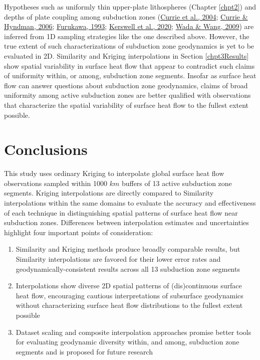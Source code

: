 Hypotheses such as uniformly thin upper-plate lithospheres (Chapter \ref{chpt2}) and depths of plate coupling among subduction zones (\protect\hyperlink{ref-currie2004}{Currie et al., 2004}; \protect\hyperlink{ref-currie2006}{Currie \& Hyndman, 2006}; \protect\hyperlink{ref-furukawa1993}{Furukawa, 1993}; \protect\hyperlink{ref-kerswell2020}{Kerswell et al., 2020}; \protect\hyperlink{ref-wada2009}{Wada \& Wang, 2009}) are inferred from 1D sampling strategies like the one described above. However, the true extent of such characterizations of subduction zone geodynamics is yet to be evaluated in 2D. Similarity and Kriging interpolations in Section \ref{chpt3Results} show spatial variability in surface heat flow that appear to contradict such claims of uniformity within, or among, subduction zone segments. Insofar as surface heat flow can answer questions about subduction zone geodynamics, claims of broad uniformity among active subduction zones are better qualified with observations that characterize the spatial variability of surface heat flow to the fullest extent possible.

\hypertarget{conclusions-1}{%
\section{Conclusions}\label{conclusions-1}}

This study uses ordinary Kriging to interpolate global surface heat flow observations sampled within 1000 \(km\) buffers of 13 active subduction zone segments. Kriging interpolations are directly compared to Similarity interpolations within the same domains to evaluate the accuracy and effectiveness of each technique in distinguishing spatial patterns of surface heat flow near subduction zones. Differences between interpolation estimates and uncertainties highlight four important points of consideration:

\begin{enumerate}
\def\labelenumi{\arabic{enumi}.}
\tightlist
\item
  Similarity and Kriging methods produce broadly comparable results, but Similarity interpolations are favored for their lower error rates and geodynamically-consistent results across all 13 subduction zone segments
\item
  Interpolations show diverse 2D spatial patterns of (dis)continuous surface heat flow, encouraging cautious interpretations of subsurface geodynamics without characterizing surface heat flow distributions to the fullest extent possible
\item
  Dataset scaling and composite interpolation approaches promise better tools for evaluating geodynamic diversity within, and among, subduction zone segments and is proposed for future research
\end{enumerate}

